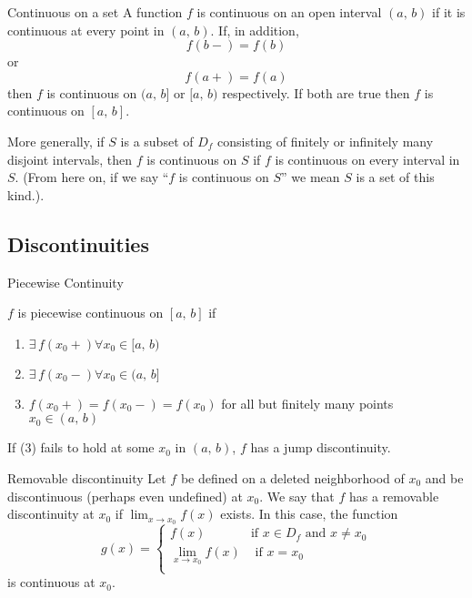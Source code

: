 \documentclass{article}
\newcommand{\ex}{\exists\,}
\begin{document}
\noindent\begin{definition}{Continuous on a set}{}{
 A function $f$ is continuous on an open interval $(a,\, b)$ if it is continuous at every point in $(a,\, b)$. If, in addition,
 \begin{equation}
   f(b-)=f(b)
 \end{equation}
 or
 \begin{equation}
   f(a+) = f(a)
 \end{equation}
 then $f$ is continuous on $(a,\,b]$ or $[a,\,b)$ respectively. If both are true then $f$ is continuous on $[a,\,b]$.
}\end{definition}\vspace{10pt}
More generally, if $S$ is a subset of $D_f$ consisting of finitely or infinitely many disjoint intervals, then $f$ is continuous on $S$ if $f$ is continuous on every interval in $S$. (From here on, if we say ``$f$ is continuous on $S$'' we mean $S$ is a set of this kind.).

\subsection{Discontinuities}

\noindent\begin{definition}{Piecewise Continuity}{}{
  $f$ is {\color{blue} piecewise continuous }on $[a,\,b]$ if
  \begin{enumerate}
    \item $\ex f(x_0+)\forall x_0\in[a,\,b)$
    \item $\ex f(x_0-)\forall x_0\in(a,\,b]$
    \item $f(x_0+) = f(x_0-) = f(x_0)$ for all but finitely many points $x_0\in (a,\,b)$
  \end{enumerate}
  If (3) fails to hold at some $x_0$ in $(a,\,b)$, $f$ has a {\color{blue}  jump discontinuity}.
}\end{definition}\vspace{10pt}

\noindent\begin{definition}{Removable discontinuity}{}{
Let $f$ be defined on a deleted neighborhood of $x_0$ and be discontinuous (perhaps even undefined) at $x_0$. We say that $f$ has a removable discontinuity at $x_0$ if $\lim_{x\to x_0}{f(x)}$ exists. In
this case, the function
$$g(x) = \begin{cases}
  f(x) & \text{if $x\in D_f$ and $x\neq x_0$} \\
  \lim_{x\to x_0}{f(x)} & \text{ if $x = x_0$}\\
\end{cases} $$
is continuous at $x_0$.
}\end{definition}\vspace{10pt}
\end{document}
